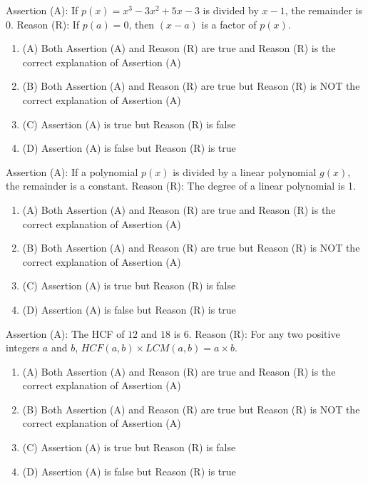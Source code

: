 \documentclass[12pt,a4paper]{exam}
\begin{document}
\begin{questions}
\question[1] Assertion (A): If $p(x) = x^3 - 3x^2 + 5x - 3$ is divided by $x-1$, the remainder is 0. Reason (R): If $p(a) = 0$, then $(x-a)$ is a factor of $p(x)$.
\begin{enumerate}[label=(\Alph*)]
  \item (A) Both Assertion (A) and Reason (R) are true and Reason (R) is the correct explanation of Assertion (A)
  \item (B) Both Assertion (A) and Reason (R) are true but Reason (R) is NOT the correct explanation of Assertion (A)
  \item (C) Assertion (A) is true but Reason (R) is false
  \item (D) Assertion (A) is false but Reason (R) is true
\end{enumerate}
\vspace{0.15cm}

\question[1] Assertion (A): If a polynomial $p(x)$ is divided by a linear polynomial $g(x)$, the remainder is a constant. Reason (R): The degree of a linear polynomial is 1.
\begin{enumerate}[label=(\Alph*)]
  \item (A) Both Assertion (A) and Reason (R) are true and Reason (R) is the correct explanation of Assertion (A)
  \item (B) Both Assertion (A) and Reason (R) are true but Reason (R) is NOT the correct explanation of Assertion (A)
  \item (C) Assertion (A) is true but Reason (R) is false
  \item (D) Assertion (A) is false but Reason (R) is true
\end{enumerate}
\vspace{0.15cm}

\question[1] Assertion (A): The HCF of $12$ and $18$ is $6$. Reason (R): For any two positive integers $a$ and $b$, $HCF(a, b) \times LCM(a, b) = a \times b$.
\begin{enumerate}[label=(\Alph*)]
  \item (A) Both Assertion (A) and Reason (R) are true and Reason (R) is the correct explanation of Assertion (A)
  \item (B) Both Assertion (A) and Reason (R) are true but Reason (R) is NOT the correct explanation of Assertion (A)
  \item (C) Assertion (A) is true but Reason (R) is false
  \item (D) Assertion (A) is false but Reason (R) is true
\end{enumerate}
\vspace{0.15cm}


\end{questions}
\end{document}
